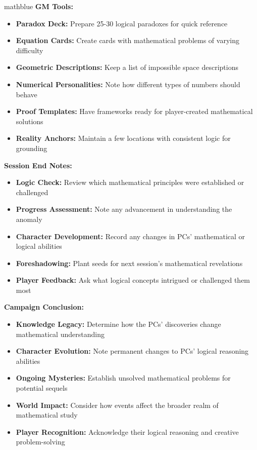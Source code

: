 \documentclass[11pt]{article}
\begin{document}
\begin{campaignsection}{mathblue}
\textbf{GM Tools:}
\begin{itemize}
    \item \textbf{Paradox Deck:} Prepare 25-30 logical paradoxes for quick reference
    \item \textbf{Equation Cards:} Create cards with mathematical problems of varying difficulty
    \item \textbf{Geometric Descriptions:} Keep a list of impossible space descriptions
    \item \textbf{Numerical Personalities:} Note how different types of numbers should behave
    \item \textbf{Proof Templates:} Have frameworks ready for player-created mathematical solutions
    \item \textbf{Reality Anchors:} Maintain a few locations with consistent logic for grounding
\end{itemize}

\textbf{Session End Notes:}
\begin{itemize}
    \item \textbf{Logic Check:} Review which mathematical principles were established or challenged
    \item \textbf{Progress Assessment:} Note any advancement in understanding the anomaly
    \item \textbf{Character Development:} Record any changes in PCs' mathematical or logical abilities
    \item \textbf{Foreshadowing:} Plant seeds for next session's mathematical revelations
    \item \textbf{Player Feedback:} Ask what logical concepts intrigued or challenged them most
\end{itemize}

\textbf{Campaign Conclusion:}
\begin{itemize}
    \item \textbf{Knowledge Legacy:} Determine how the PCs' discoveries change mathematical understanding
    \item \textbf{Character Evolution:} Note permanent changes to PCs' logical reasoning abilities
    \item \textbf{Ongoing Mysteries:} Establish unsolved mathematical problems for potential sequels
    \item \textbf{World Impact:} Consider how events affect the broader realm of mathematical study
    \item \textbf{Player Recognition:} Acknowledge their logical reasoning and creative problem-solving
\end{itemize}
\end{campaignsection}
\end{document}
